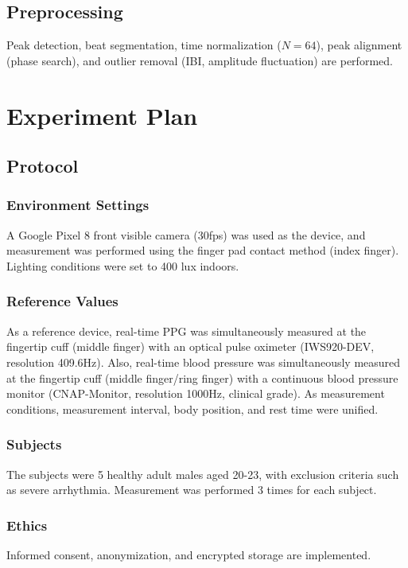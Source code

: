\documentclass[fleqn,10pt,twocolumn]{AROB}
\begin{document}
\subsection{Preprocessing}
Peak detection, beat segmentation, time normalization ($N=64$), peak alignment (phase search), and outlier removal (IBI, amplitude fluctuation) are performed.


\section{Experiment Plan}
\subsection{Protocol}
\subsubsection{Environment Settings}
A Google Pixel 8 front visible camera (30fps) was used as the device, and measurement was performed using the finger pad contact method (index finger). Lighting conditions were set to 400 lux indoors.

\subsubsection{Reference Values}
As a reference device, real-time PPG was simultaneously measured at the fingertip cuff (middle finger) with an optical pulse oximeter (IWS920-DEV, resolution 409.6Hz). Also, real-time blood pressure was simultaneously measured at the fingertip cuff (middle finger/ring finger) with a continuous blood pressure monitor (CNAP-Monitor, resolution 1000Hz, clinical grade). As measurement conditions, measurement interval, body position, and rest time were unified.

\subsubsection{Subjects}
The subjects were 5 healthy adult males aged 20-23, with exclusion criteria such as severe arrhythmia. Measurement was performed 3 times for each subject.

\subsubsection{Ethics}
Informed consent, anonymization, and encrypted storage are implemented.
\end{document}
